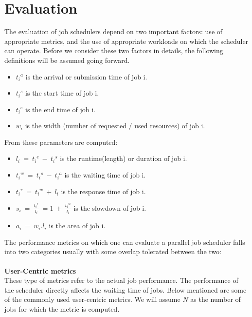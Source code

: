 \chapter{Evaluation}\label{chapter:evaluation}
The evaluation of job schedulers depend on two important factors: use of appropriate metrics, and the use of appropriate workloads on which the scheduler can operate. Before we consider these two factors in details, the following definitions will be assumed going forward.
\begin{itemize}
\item \textit{${t_{i}}^{a}$} is the arrival or submission time of job i.
\item \textit{${t_{i}}^{s}$} is the start time of job i.
\item \textit{${t_{i}}^{e}$} is the end time of job i.
\item \textit{$w_{i}$} is the width (number of requested / used resources) of job i.
\end{itemize}
From these parameters are computed:
\begin{itemize}
\item \textit{$l_{i}\ =\ {t_{i}}^{e}\ -\ {t_{i}}^{s}$} is the runtime(length) or duration of job i.
\item \textit{${t_{i}}^{w}\ =\ {t_{i}}^{s}\ -\ {t_{i}}^{a}$} is the waiting time of job i.
\item \textit{${t_{i}}^{r}\ =\ {t_{i}}^{w}\ +\ l_{i}$} is the response time of job i.
\item \textit{$s_{i}\ =\ \frac{{t_{i}}^{r}}{l_{i}}\ = 1\ +\ \frac{{t_{i}}^{w}}{l_{i}}$} is the slowdown of job i.
\item \textit{$a_{i}\ =\ w_{i}.l_{i}$} is the area of job i.
\end{itemize}
The performance metrics on which one can evaluate a parallel job scheduler falls into two categories usually with some overlap tolerated between the two:\\ \\
\textbf{User-Centric metrics\cite{streit}}\\
These type of metrics refer to the actual job performance. The performance of the scheduler directly affects the waiting time of jobs. Below mentioned are some of the commonly used user-centric metrics. We will assume $N$ as the number of jobs for which the metric is computed.
